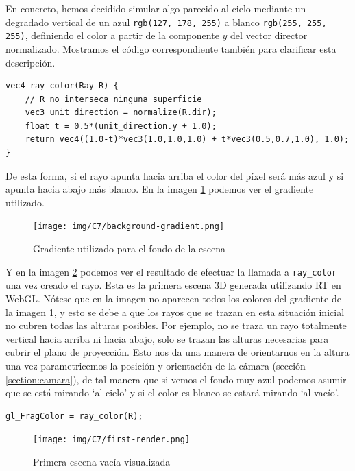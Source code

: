 En concreto, hemos decidido simular algo parecido al cielo mediante un degradado vertical de un \textcolor{background-blue}{azul} \texttt{rgb(127, 178, 255)} a blanco \texttt{rgb(255, 255, 255)}, definiendo el color a partir de la componente $y$ del vector director normalizado. Mostramos el código correspondiente también para clarificar esta descripción.

\begin{lstlisting}
vec4 ray_color(Ray R) {
    // R no interseca ninguna superficie
    vec3 unit_direction = normalize(R.dir);
    float t = 0.5*(unit_direction.y + 1.0);
    return vec4((1.0-t)*vec3(1.0,1.0,1.0) + t*vec3(0.5,0.7,1.0), 1.0);
}
\end{lstlisting}

De esta forma, si el rayo apunta hacia arriba el color del píxel será más azul y si apunta hacia abajo más blanco. En la imagen \ref{fig:background} podemos ver el gradiente utilizado.

\begin{figure} [ht]
    \centering
    \texttt{[image: img/C7/background-gradient.png]}
    \caption{Gradiente utilizado para el fondo de la escena}
    \label{fig:background}
\end{figure}

Y en la imagen \ref{fig:first-render} podemos ver el resultado de efectuar la llamada a \verb|ray_color| una vez creado el rayo. Esta es la primera escena 3D generada utilizando RT en WebGL. Nótese que en la imagen no aparecen todos los colores del gradiente de la imagen \ref{fig:background}, y esto se debe a que los rayos que se trazan en esta situación inicial no cubren todas las alturas posibles. Por ejemplo, no se traza un rayo totalmente vertical hacia arriba ni hacia abajo, solo se trazan las alturas necesarias para cubrir el plano de proyección. Esto nos da una manera de orientarnos en la altura una vez parametricemos la posición y orientación de la cámara (sección \ref{section:camara}), de tal manera que si vemos el fondo muy azul podemos asumir que se está mirando `al cielo' y si el color es blanco se estará mirando `al vacío'. 

\begin{lstlisting}
gl_FragColor = ray_color(R);
\end{lstlisting}

\begin{figure} [ht]
    \centering
    \texttt{[image: img/C7/first-render.png]}
    \caption{Primera escena vacía visualizada}
    \label{fig:first-render}
\end{figure}

